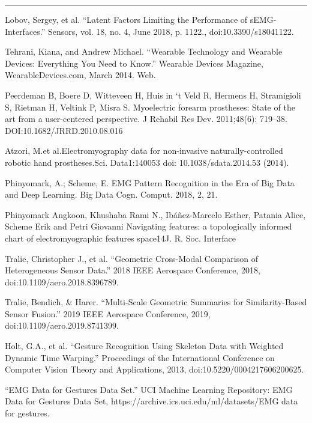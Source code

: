\documentclass[11pt]{article}
\begin{document}
\begin{center}
\noindent\rule{16cm}{0.4pt}
\end{center}


\begin{thebibliography}{5}

 Lobov, Sergey, et al. “Latent Factors Limiting the Performance of sEMG-Interfaces.” Sensors, vol. 18, no. 4, June 2018, p. 1122., doi:10.3390/s18041122.

 Tehrani, Kiana, and Andrew Michael. “Wearable Technology and Wearable Devices: Everything You Need to Know.” Wearable Devices Magazine, WearableDevices.com, March 2014. Web.

 Peerdeman  B,  Boere  D,  Witteveen  H,  Huis  in  ‘t  Veld  R,  Hermens H, Stramigioli S, Rietman H, Veltink P, Misra S. Myoelectric  forearm  prostheses:  State  of  the  art  from  a  user-centered perspective. J Rehabil Res Dev. 2011;48(6): 719–38. DOI:10.1682/JRRD.2010.08.016

 Atzori, M.et al.Electromyography data for non-invasive naturally-controlled robotic hand prostheses.Sci. Data1:140053 doi: 10.1038/sdata.2014.53 (2014).

 Phinyomark, A.; Scheme, E. EMG Pattern Recognition in the Era of Big Data and Deep Learning. Big Data Cogn. Comput. 2018, 2, 21. 

 Phinyomark Angkoon, Khushaba Rami N., Ibáñez-Marcelo Esther, Patania Alice, Scheme Erik and Petri Giovanni Navigating features: a topologically informed chart of electromyographic features space14J. R. Soc. Interface

 Tralie, Christopher J., et al. “Geometric Cross-Modal Comparison of Heterogeneous Sensor Data.” 2018 IEEE Aerospace Conference, 2018, doi:10.1109/aero.2018.8396789.

 Tralie, Bendich, \& Harer. “Multi-Scale Geometric Summaries for Similarity-Based Sensor Fusion.” 2019 IEEE Aerospace Conference, 2019, doi:10.1109/aero.2019.8741399.

 Holt, G.A., et al. “Gesture Recognition Using Skeleton Data with Weighted Dynamic Time Warping.” Proceedings of the International Conference on Computer Vision Theory and Applications, 2013, doi:10.5220/0004217606200625.

 “EMG Data for Gestures Data Set.” UCI Machine Learning Repository: EMG Data for Gestures Data Set, https://archive.ics.uci.edu/ml/datasets/EMG data for gestures.

\end{thebibliography}
  
\end{document}
